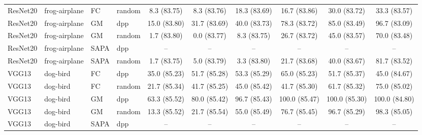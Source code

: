 \begin{table}[h]
{\begin{tabular}{llllcccccc}
ResNet20 & frog-airplane & FC & random
& 8.3 \small{(83.75)}
& 8.3 \small{(83.76)}
& 18.3 \small{(83.69)}
& 16.7 \small{(83.86)}
& 30.0 \small{(83.72)}
& 33.3 \small{(83.57)} \\ [1em]



ResNet20 & frog-airplane & GM & dpp
& 15.0 \small{(83.80)}
& 31.7 \small{(83.69)}
& 40.0 \small{(83.73)}
& 78.3 \small{(83.72)}
& 85.0 \small{(83.49)}
& 96.7 \small{(83.09)} \\


ResNet20 & frog-airplane & GM & random
& 1.7 \small{(83.80)}
& 0.0 \small{(83.77)}
& 8.3 \small{(83.75)}
& 26.7 \small{(83.72)}
& 45.0 \small{(83.57)}
& 70.0 \small{(83.48)} \\ [1em]

ResNet20 & frog-airplane & SAPA & dpp
& --
& --
& --
& --
& --
& -- \\



ResNet20 & frog-airplane & SAPA & random
& 1.7 \small{(83.75)}
& 5.0 \small{(83.79)}
& 3.3 \small{(83.80)}
& 21.7 \small{(83.68)}
& 40.0 \small{(83.67)}
& 81.7 \small{(83.52)} \\ [0.1em]


\hline





VGG13 & dog-bird & FC & dpp
& 35.0 \small{(85.23)}
& 51.7 \small{(85.28)}
& 53.3 \small{(85.29)}
& 65.0 \small{(85.23)}
& 51.7 \small{(85.37)}
& 45.0 \small{(84.67)} \\


VGG13 & dog-bird & FC & random
& 21.7 \small{(85.34)}
& 41.7 \small{(85.25)}
& 45.0 \small{(85.42)}
& 41.7 \small{(85.30)}
& 61.7 \small{(85.32)}
& 75.0 \small{(85.02)} \\
\addlinespace

VGG13 & dog-bird & GM & dpp
& 63.3 \small{(85.52)}
& 80.0 \small{(85.42)}
& 96.7 \small{(85.43)}
& 100.0 \small{(85.47)}
& 100.0 \small{(85.30)}
& 100.0 \small{(84.80)} \\



VGG13 & dog-bird & GM & random
& 13.3 \small{(85.52)}
& 21.7 \small{(85.54)}
& 55.0 \small{(85.49)}
& 76.7 \small{(85.45)}
& 96.7 \small{(85.29)}
& 98.3 \small{(85.05)} \\ [1em]

VGG13 & dog-bird & SAPA & dpp
& --
& --
& --
& --
& --
& -- \\




\end{tabular}}
\end{table}
